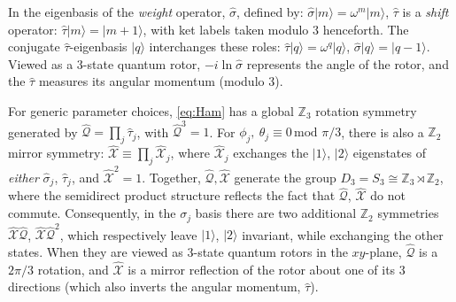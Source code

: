 \documentclass[prb,aps, twocolumn, superscriptaddress]{revtex4-1}
\newcommand{\tmod}[1]{\,\text{mod $#1$}}
\def\ket#1{{|#1\rangle}}
\begin{document}
In the eigenbasis of the {\it weight} operator, ${\hat{\sigma}}$, defined by: ${\hat{\sigma}} \ket{m} = \omega^{m} \ket{m}$, ${\hat{\tau}}$ is a {\it shift} operator:  ${\hat{\tau}} \ket{m} = \ket{m+1}$, with ket labels taken modulo $3$ henceforth. The conjugate $\hat{\tau}$-eigenbasis $\ket{q}$ interchanges these roles: ${\hat{\tau}} \ket{q}= \omega^{q}\ket{q}$, ${\hat{\sigma}} \ket{q} = \ket{q-1}$. Viewed as a 3-state quantum rotor, $-i \ln \hat{\sigma}$ represents the angle of the rotor, and the $\hat{\tau}$ measures its angular momentum (modulo 3).

For generic parameter choices, \eqref{eq:Ham} has a global ${\mathbb{Z}_3}$ rotation symmetry generated 
by ${\hat{\mathcal{Q}}} = \prod_j {\hat{\tau}}_j$, with ${\hat{\mathcal{Q}}}^3=1$. For  $\phi_j,~\theta_j \equiv 0 \tmod{\pi/3}$, there is also a {$\mathbb{Z}_2$ mirror symmetry:} ${\hat{\mathcal{X}}} \equiv \prod_j {\hat{\mathcal{X}}}_j$, where ${\hat{\mathcal{X}}}_j$ exchanges the $\ket{1}$, $\ket{2}$ eigenstates of \emph{either} $\hat{\sigma}_j$, $\hat{\tau}_j$, and ${\hat{\mathcal{X}}}^2 =1$. Together, ${\hat{\mathcal{Q}}}, {\hat{\mathcal{X}}}$ generate the group $D_3 = S_3 \cong {\mathbb{Z}_3}\rtimes {\mathbb{Z}_2}$, where the semidirect product structure reflects the fact that ${\hat{\mathcal{Q}}}$,  ${\hat{\mathcal{X}}}$ do not commute. Consequently, in the $\sigma_j$ basis there are two additional ${\mathbb{Z}_2}$ symmetries ${\hat{\mathcal{X}}\hat{\mathcal{Q}}}$, ${\hat{\mathcal{X}}\hat{\mathcal{Q}}}^2$, which respectively leave $\ket{1}$, $\ket{2}$ invariant, while exchanging the other states.
{When they are viewed as $3$-state quantum rotors in the $xy$-plane, $\hat{\mathcal{Q}}$ is a $2\pi/3$ rotation, and $\hat{\mathcal{X}}$ is a mirror reflection of the rotor about one of its $3$ directions (which also inverts the angular momentum, $\hat{\tau}$).}
\end{document}
